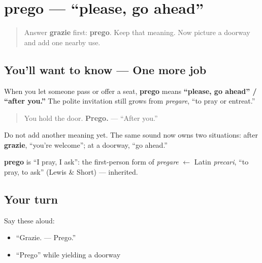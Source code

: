 \section[prego — go ahead]{prego — \textquotedblleft{}please, go ahead\textquotedblright{}}

\label{lesson:IT-C02-prego-go-ahead}



\begin{quote}
Answer \textbf{grazie} first: \textbf{prego}. Keep that meaning. Now picture a doorway and add one nearby use.
\end{quote}

\subsection*{You'll want to know — One more job}
When you let someone pass or offer a seat, \textbf{prego} means \textbf{\textquotedblleft{}please, go ahead\textquotedblright{} / \textquotedblleft{}after you.\textquotedblright{}} The polite invitation still grows from \emph{pregare}, \textquotedblleft{}to pray or entreat.\textquotedblright{}

\begin{quote}
You hold the door. \textbf{Prego.} — \textquotedblleft{}After you.\textquotedblright{}
\end{quote}

Do not add another meaning yet. The same sound now owns two situations: after \textbf{grazie}, \textquotedblleft{}you're welcome\textquotedblright{}; at a doorway, \textquotedblleft{}go ahead.\textquotedblright{}

\begin{cousinweb}
\textbf{prego} is \textquotedblleft{}I pray, I ask\textquotedblright{}: the first-person form of \emph{pregare} $\leftarrow$ Latin \emph{precari}, \textquotedblleft{}to pray, to ask\textquotedblright{} (Lewis \& Short) — inherited.
\end{cousinweb}

\subsection*{Your turn}
Say these aloud:

\begin{itemize}
\raggedright
  \item \textquotedblleft{}Grazie. — Prego.\textquotedblright{}
  \item \textquotedblleft{}Prego\textquotedblright{} while yielding a doorway
\end{itemize}

